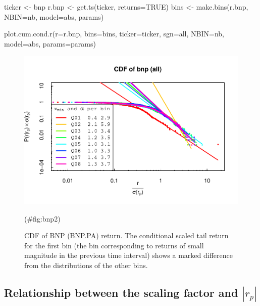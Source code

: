 \documentclass[
  11pt,
]{article}
\newenvironment{Shaded}{\begin{snugshade}}{\end{snugshade}}
\newcommand{\AttributeTok}[1]{\textcolor[rgb]{0.77,0.63,0.00}{#1}}
\newcommand{\ConstantTok}[1]{\textcolor[rgb]{0.00,0.00,0.00}{#1}}
\newcommand{\FunctionTok}[1]{\textcolor[rgb]{0.00,0.00,0.00}{#1}}
\newcommand{\NormalTok}[1]{#1}
\newcommand{\OtherTok}[1]{\textcolor[rgb]{0.56,0.35,0.01}{#1}}
\newcommand{\StringTok}[1]{\textcolor[rgb]{0.31,0.60,0.02}{#1}}
\begin{document}
\begin{Shaded}
\begin{Highlighting}[]
\NormalTok{ticker }\OtherTok{\textless{}{-}} \StringTok{\textquotesingle{}bnp\textquotesingle{}}
\NormalTok{r.bnp }\OtherTok{\textless{}{-}} \FunctionTok{get.ts}\NormalTok{(ticker, }\AttributeTok{returns=}\ConstantTok{TRUE}\NormalTok{)}
\NormalTok{bins }\OtherTok{\textless{}{-}} \FunctionTok{make.bins}\NormalTok{(r.bnp, }\AttributeTok{NBIN=}\NormalTok{nb, }\AttributeTok{model=}\StringTok{\textquotesingle{}abs\textquotesingle{}}\NormalTok{, params)}
\end{Highlighting}
\end{Shaded}

\begin{Shaded}
\begin{Highlighting}[]
\FunctionTok{plot.cum.cond.r}\NormalTok{(}\AttributeTok{r=}\NormalTok{r.bnp, }\AttributeTok{bins=}\NormalTok{bins, }\AttributeTok{ticker=}\NormalTok{ticker, }\AttributeTok{sgn=}\StringTok{\textquotesingle{}all\textquotesingle{}}\NormalTok{,}
\AttributeTok{NBIN=}\NormalTok{nb, }\AttributeTok{model=}\StringTok{\textquotesingle{}abs\textquotesingle{}}\NormalTok{, }\AttributeTok{params=}\NormalTok{params)}
\end{Highlighting}
\end{Shaded}

\begin{figure}[H]
\includegraphics[width=0.7\linewidth,height=0.7\textheight]{figs/bnp2-1} \caption{CDF of BNP (BNP.PA) return. The conditional scaled tail return for the first bin (the bin corresponding to returns of small magnitude in the previous time interval) shows a marked difference from the distributions of the other bins.}(\#fig:bnp2)
\end{figure}

\hypertarget{relationship-between-the-scaling-factor-and-r_p}{%
\subsection{\texorpdfstring{Relationship between the scaling factor and
\(|r_p|\)}{Relationship between the scaling factor and \textbar r\_p\textbar{}}}\label{relationship-between-the-scaling-factor-and-r_p}}
\end{document}
